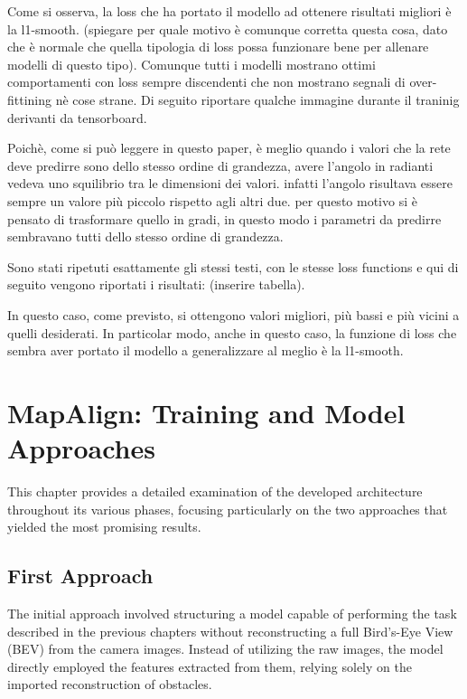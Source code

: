 Come si osserva, la loss che ha portato il modello ad ottenere risultati migliori è la l1-smooth. (spiegare per quale motivo è comunque corretta questa cosa, dato che è normale che quella tipologia di loss possa funzionare bene per allenare modelli di questo tipo). 
Comunque tutti i modelli mostrano ottimi comportamenti con loss sempre discendenti che non mostrano segnali di over-fittining nè cose strane. 
Di seguito riportare qualche immagine durante il traninig derivanti da tensorboard. 

Poichè, come si può leggere in questo paper, è meglio quando i valori che la rete deve predirre sono dello stesso ordine di grandezza, avere l'angolo in radianti vedeva uno squilibrio tra le dimensioni dei valori. infatti l'angolo risultava essere sempre un valore più piccolo rispetto agli altri due. per questo motivo si è pensato di trasformare quello in gradi, in questo modo i parametri da predirre sembravano tutti dello stesso ordine di grandezza. 

Sono stati ripetuti esattamente gli stessi testi, con le stesse loss functions e qui di seguito vengono riportati i risultati:
(inserire tabella). 

In questo caso, come previsto, si ottengono valori migliori, più bassi e più vicini a quelli desiderati. In particolar modo, anche in questo caso, la funzione di loss che sembra aver portato il modello a generalizzare al meglio è la l1-smooth. 


\NoBgThispage
\chapter{MapAlign: Training and Model Approaches}

This chapter provides a detailed examination of the developed architecture throughout its various phases, focusing particularly on the two approaches that yielded the most promising results.

\section{First Approach}

The initial approach involved structuring a model capable of performing the task described in the previous chapters without reconstructing a full Bird's-Eye View (BEV) from the camera images. Instead of utilizing the raw images, the model directly employed the features extracted from them, relying solely on the imported reconstruction of obstacles.

